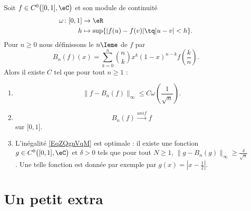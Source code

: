 \begin{theorem}
    Soit \( f\in C^0\big( \mathopen[ 0 , 1 \mathclose],\eC \big)\) et son module de continuité
    \begin{equation}
        \begin{aligned}
            \omega\colon \mathopen[ 0 , 1 \mathclose]&\to \eR \\
            h&\mapsto \sup\{ | f(u)-f(v) |\tq | u-v |< h \}. 
        \end{aligned}
    \end{equation}
    Pour \( n\geq 0\) nous définissons le \( n\Ieme\)  de \( f\) par
    \begin{equation}
        B_n(f)(x)=\sum_{k=0}^{n}\binom{ n }{ k }x^k(1-x)^{n-k}f\left( \frac{ k }{ n } \right).
    \end{equation}
    Alors il existe \( C\) tel que pour tout \( n\geq 1\) :
    \begin{enumerate}
        \item
            \begin{equation}        \label{EqZQgnVqM}
                \| f-B_n(f) \|_{\infty}\leq C\omega\left( \frac{1}{ \sqrt{n} } \right).
            \end{equation}
        \item
            \begin{equation}
                B_n(f)\stackrel{unif}{\longrightarrow}f
            \end{equation}
            sur \( \mathopen[ 0 , 1 \mathclose]\).
        \item
            L'inégalité \eqref{EqZQgnVqM} est optimale : il existe une fonction \( g\in C^{0}\big( \mathopen[ 0 , 1 \mathclose],\eC \big)\) et \( \delta>0\) tels que pour tout \( N\geq 1\), \( \| g-B_n(g) \|_{\infty}\geq\frac{ \delta }{ \sqrt{n} }\). Une telle fonction est donnée par exemple par \( g(x)=| x-\frac{ 1 }{2} |\).
    \end{enumerate}
\end{theorem}

					\section{Un petit extra}


